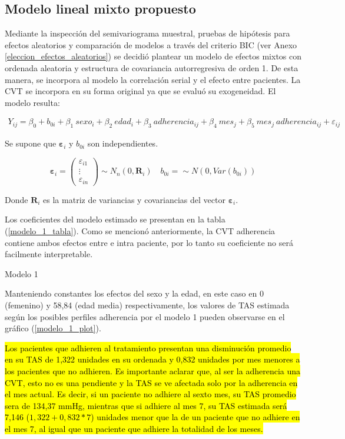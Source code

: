 \documentclass[spanish]{article}
\numberwithin{figure}{subsection}
\numberwithin{equation}{subsection}
\numberwithin{table}{subsection}
\begin{document}
\subsection{Modelo lineal mixto propuesto}

Mediante la inspección del semivariograma muestral, pruebas de hipótesis para
efectos aleatorios y comparación de modelos a través del criterio BIC (ver Anexo
\ref{eleccion_efectos_aleatorios}) se decidió plantear un modelo de efectos
mixtos con ordenada aleatoria y estructura de covariancia autorregresiva de
orden 1. De esta manera, se incorpora al modelo la correlación serial y el
efecto entre pacientes. La CVT se incorpora en su forma original ya que se
evaluó su exogeneidad. El modelo resulta:

\begin{multline}
	\label{modelo_1}
	Y_{ij} = \beta_0 + b_{0i} + \beta_1\ sexo_i + \beta_2\ edad_i + \beta_3\ adherencia_{ij}
	+ \beta_4\ mes_j + \beta_5\ mes_j\ adherencia_{ij} + \varepsilon_{ij}
\end{multline}

Se supone que $\bm{\varepsilon}_i$ y $b_{0i}$ son independientes.

\[ 
	\bm{\varepsilon}_i = \begin{pmatrix} \varepsilon_{i1} \\ \vdots \\ \varepsilon_{in} \end{pmatrix} \sim N_{n}(0, \bm{R}_i)
	\quad
	b_{0i} = \sim N(0, Var(b_{0i}))
\]

Donde $\bm{R}_i$ es la matriz de variancias y covariancias del vector
$\bm{\varepsilon}_i$.

Los coeficientes del modelo estimado se presentan en la tabla
(\ref{modelo_1_tabla}). Como se mencionó anteriormente, la CVT adherencia contiene
ambos efectos entre e intra paciente, por lo tanto su coeficiente no será
facilmente interpretable. 

\begin{table}[H]
	\centering
	\caption{Modelo 1}
	\label{modelo_1_tabla}
	
\end{table}

Manteniendo constantes los efectos del sexo y la edad, en este caso en 0
(femenino) y 58,84 (edad media) respectivamente, los valores de TAS estimada
según los posibles perfiles adherencia por el modelo 1 pueden observarse en el
gráfico (\ref{modelo_1_plot}).

\hl{Los pacientes que adhieren al tratamiento presentan una disminución promedio
en su TAS de 1,322 unidades en su ordenada y 0,832 unidades por mes menores a
los pacientes que no adhieren. Es importante aclarar que, al ser la adherencia
una CVT, esto no es una pendiente y la TAS se ve afectada solo por la adherencia
en el mes actual. Es decir, si un paciente no adhiere al sexto mes, su TAS
promedio sera de 134,37 mmHg, mientras que si adhiere al mes 7, su TAS estimada
será 7,146 ($1,322 + 0,832 * 7$) unidades menor que la de un paciente que no
adhiere en el mes 7, al igual que un paciente que adhiere la totalidad de los
meses.}
\end{document}
